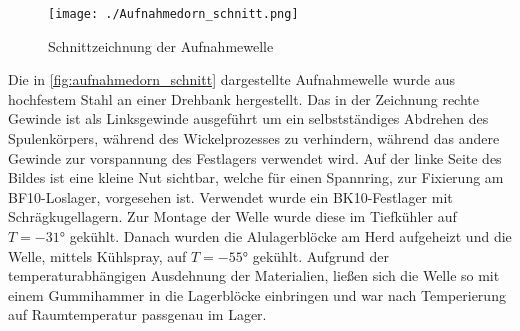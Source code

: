 

\begin{figure}[H]
    \centering
    \texttt{[image: ./Aufnahmedorn\_schnitt.png]}
    \caption{Schnittzeichnung der Aufnahmewelle}
    \label{fig:aufnahmedorn_schnitt}
\end{figure}

Die in \autoref{fig:aufnahmedorn_schnitt} dargestellte Aufnahmewelle wurde aus hochfestem Stahl an einer Drehbank hergestellt. Das in der Zeichnung rechte Gewinde ist als Linksgewinde ausgeführt um ein selbstständiges Abdrehen des Spulenkörpers, während des Wickelprozesses zu verhindern, während das andere Gewinde zur vorspannung des Festlagers verwendet wird. Auf der linke Seite des Bildes ist eine kleine Nut sichtbar, welche für einen Spannring, zur Fixierung am BF10-Loslager, vorgesehen ist. Verwendet wurde ein BK10-Festlager mit Schrägkugellagern. Zur Montage der Welle wurde diese im Tiefkühler auf $T = -31\si{\degree}$ gekühlt. Danach wurden die Alulagerblöcke am Herd aufgeheizt und die Welle, mittels Kühlspray, auf $T = -55\si{\degree}$ gekühlt. Aufgrund der temperaturabhängigen Ausdehnung der Materialien, ließen sich die Welle so mit einem Gummihammer in die Lagerblöcke einbringen und war nach Temperierung auf Raumtemperatur passgenau im Lager.